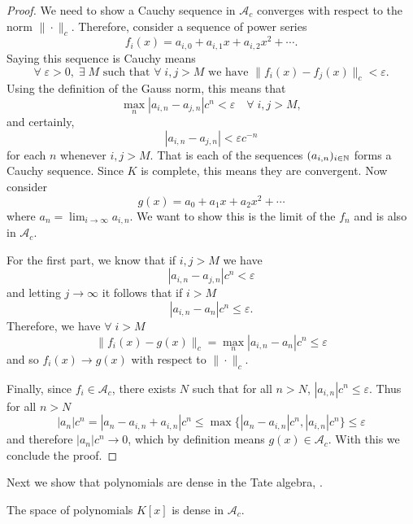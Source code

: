 \begin{proof}
    We need to show a Cauchy sequence in $\mathcal{A}_c$ converges with respect to the norm
    $\|\cdot\|_c$. Therefore, consider a sequence of power series
    \[
    f_i(x) = a_{i,0} + a_{i,1}x + a_{i,2}x^2 + \cdots.
    \]
    Saying this sequence is Cauchy means
    \[
    \forall \; \varepsilon>0, \; \exists \; M \text{ such that } \forall \; i,j > M
    \text{ we have } \|f_i (x) - f_j (x) \|_c < \varepsilon.
    \]
    Using the definition of the Gauss norm, this means that
    \[
    \max_{n} |a_{i,n}-a_{j,n} | c^n < \varepsilon \quad \forall \; i,j > M,
    \]
    and certainly,
    \[
    |a_{i,n} - a_{j,n}| < \varepsilon c^{-n}
    \]
    for each $n$ whenever $i,j > M.$ That is each of the sequences $(a_{i,n})_{i \in \mathbb{N}}$ forms a
    Cauchy sequence. Since $K$ is complete, this means they are convergent.
    Now consider
    \[
    g(x) = a_0 + a_1 x + a_2 x^2 + \cdots
    \]
    where $a_n = \lim_{i \to \infty} a_{i,n}$. We want to show this is the limit of the $f_n$ and
    is also in $\mathcal{A}_c$.

    For the first part, we know that if $i,j > M$ we have
    \[
    |a_{i,n} - a_{j,n} | c^n < \varepsilon
    \]
    and letting $j \to \infty$ it follows that if $i > M$
    \[
    | a_{i,n} - a_n| c^n \leq \varepsilon.
    \]
    Therefore, we have $\forall \; i > M$
    \[
    \| f_i (x) - g(x) \|_c = \max_n |a_{i,n} - a_n| c^n \leq \varepsilon
    \]
    and so $f_i(x) \to g(x)$ with respect to $\| \cdot \|_c.$

    Finally, since $f_ i \in \mathcal{A}_c$, there exists $N$ such that for all
    $n > N$, $|a_{i,n} | c^n \leq \varepsilon.$ Thus for all $n > N$
    \[
    | a_n |c^n = | a_n - a_{i,n} + a_{i,n}|c^n  \leq \max \{|a_n - a_{i,n}|c^n,|a_{i,n}|c^n\} \leq \varepsilon
    \]
    and therefore $|a_n|c^n \to 0$, which by definition means $g(x) \in \mathcal{A}_c$.
    With this we conclude the proof.
\end{proof}

Next we show that polynomials are dense in the Tate algebra, \cite[Lemma~7.2.8]{Gouvea}.
\begin{lemma}\label{PolyDense}
    The space of polynomials $K[x]$ is dense in $\mathcal{A}_c$.
\end{lemma}

